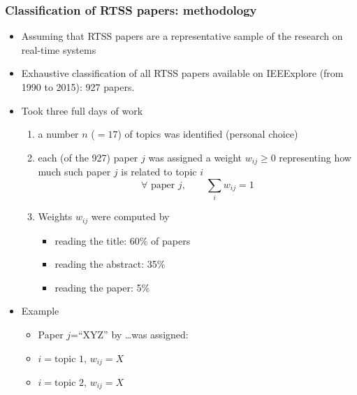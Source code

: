 \documentclass[ignorenonframetext,mathserif]{beamer} %
\begin{document}
\begin{frame}
  \frametitle{Classification of RTSS papers: methodology}
  
  \begin{itemize}
  \item Assuming that RTSS papers are a representative sample of the
    research on real-time systems
  \item Exhaustive classification of all RTSS papers available on
    IEEExplore (from 1990 to 2015): 927 papers.  
  \item Took three full days of work
    \begin{enumerate}
    \item a number $n$ ($=17$) of topics was identified (personal
      choice)
    \item each (of the 927) paper $j$ was assigned a weight
      $w_{ij}\geq 0$ representing how much such paper $j$ is related
      to topic $i$
      \[
      \forall \text{ paper } j,\qquad\sum_i w_{ij}= 1
      \]
    \item Weights $w_{ij}$ were computed by
      \begin{itemize}
      \item reading the title: 60\% of papers
      \item reading the abstract: 35\%
      \item reading the paper: 5\%
      \end{itemize}
    \end{enumerate}
  \item Example
    \begin{itemize}
    \item Paper $j$=``XYZ'' by \dots was assigned:
    \item $i=\text{topic 1}$, $w_{ij}=X$
    \item $i=\text{topic 2}$, $w_{ij}=X$
    \end{itemize}
  \end{itemize}
\end{frame}
\end{document}
